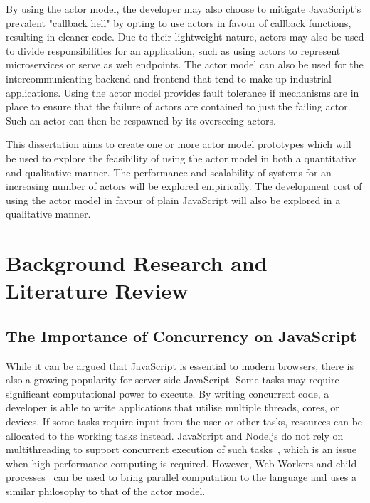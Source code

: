 \documentclass[12pt]{article}
\begin{document}
By using the actor model, the developer may also choose to mitigate JavaScript's prevalent "callback hell" by opting to use actors in favour of callback functions, resulting in cleaner code. Due to their lightweight nature, actors may also be used to divide responsibilities for an application, such as using actors to represent microservices or serve as web endpoints\cite{hewitt2010actor}.  The actor model can also be used for the intercommunicating backend and frontend that tend to make up industrial applications. Using the actor model provides fault tolerance if mechanisms are in place to ensure that the failure of actors are contained to just the failing actor. Such an actor can then be respawned by its overseeing actors.

This dissertation aims to create one or more actor model prototypes which will be used to explore the feasibility of using the actor model in both a quantitative and qualitative manner. The performance and scalability of systems for an increasing number of actors will be explored empirically. The development cost of using the actor model in favour of plain JavaScript will also be explored in a qualitative manner.
\section{Background Research and Literature Review}
\subsection{The Importance of Concurrency on JavaScript}
While it can be argued that JavaScript is essential to modern browsers, there is also a growing popularity for server-side JavaScript. Some tasks may require significant computational power to execute. By writing concurrent code, a developer is able to write applications that utilise multiple threads, cores, or devices. If some tasks require input from the user or other tasks, resources can be allocated to the working tasks instead. JavaScript and Node.js do not rely on multithreading to support concurrent execution of such tasks~\cite{highperformance}, which is an issue when high performance computing is required. However, Web Workers and child processes~\cite{concurrencyjs}\cite{spidersjs} can be used to bring parallel computation to the language and uses a similar philosophy to that of the actor model.
\end{document}
